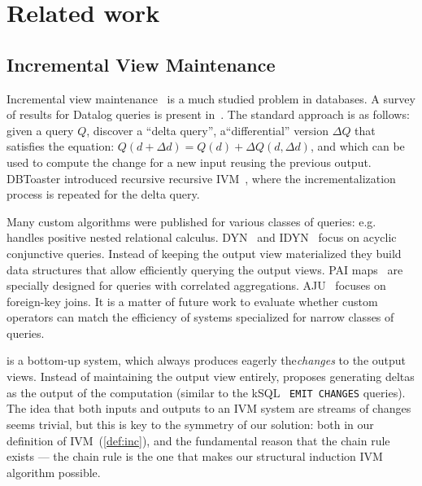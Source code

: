 \section{Related work}\label{sec:related}

\subsection{Incremental View Maintenance}

Incremental view maintenance~\cite{gupta-sigmod93, griffin-sigmod95, chaudhuri-icde95,
gupta-idb95, chirkova-book12} is a much studied problem in databases.
A survey of results for Datalog queries is present in~\cite{motik-ai19}.
The standard approach is as follows: given a query $Q$, discover a ``delta query'',
a``differential'' version $\Delta Q$ that satisfies the equation:
$Q(d+\Delta d)=Q(d)+\Delta Q(d,\Delta d)$, and which can be used to compute
the change for a new input reusing the previous output.
DBToaster introduced recursive recursive IVM~\cite{ahmad-vldb09, koch-pods10}, where
the incrementalization process is repeated for the delta query.

Many custom algorithms were published for various classes of queries: e.g.~\cite{koch-pods16}
handles positive nested relational calculus.  DYN~\cite{idris-sigmod17}
and IDYN~\cite{idris-vldb18, idris-sigmod19} focus on acyclic conjunctive queries.  Instead
of keeping the output view materialized they build data structures that allow efficiently
querying the output views.  PAI maps~\cite{abeysinghe-sigmod22} are specially
designed for queries with correlated aggregations.
AJU~\cite{wang-sigmod20} focuses on foreign-key joins.  It is a matter
of future work to evaluate whether custom \dbsp operators
can match the efficiency of systems specialized for narrow classes
of queries.

\dbsp is a bottom-up system, which always produces eagerly
the\emph{changes} to the output views.
Instead of maintaining the output view entirely, \dbsp proposes
generating deltas as the output of the computation (similar to the kSQL~\cite{jafarpour-edbt19}
\texttt{EMIT CHANGES} queries).  The idea that both
inputs and outputs to an IVM system are streams of changes
seems trivial, but this is key to the symmetry of our solution:
both in our definition of IVM~(\ref{def:inc}), and the fundamental
reason that the chain rule exists --- the chain rule is the one that makes our
structural induction IVM algorithm possible.

